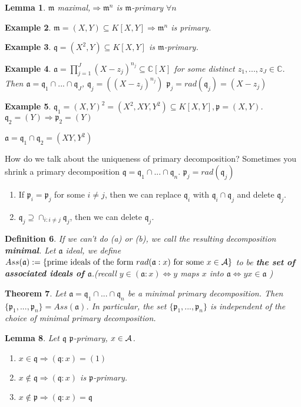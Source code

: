 \documentclass[11pt]{article}
\newtheorem{thm}{Theorem}[section]
\newtheorem{lemma}[thm]{Lemma}
\newtheorem{dfn}[thm]{Definition}
\newtheorem{ex}[thm]{Example}
\newcommand{\cplx}{\mathbb C}
\newcommand{\sca}{{\mathfrak a}}
\newcommand{\scm}{{\mathfrak m}}
\newcommand{\scp}{{\mathfrak p}}
\newcommand{\scq}{\mathfrak q}
\newcommand{\cala}{{\cal A}}
\newcommand{\Lrta}{\Longrightarrow}
\newcommand{\Llrta}{\Longleftrightarrow}
\begin{document}
\begin{lemma}
$\scm$ maximal,$\Lrta\scm^n$ is $\scm$-primary $\forall n$
\end{lemma}
\begin{ex}
$\scm=(X,Y)\subseteq K[X,Y]\Lrta \scm^n$ is primary.
\end{ex}
\begin{ex}
$\scq=(X^2,Y)\subseteq K[X,Y]$ is $\scm$-primary.
\end{ex}
\begin{ex}
$\sca=\prod^J_{j=1}(X-z_j)^{n_j}\subseteq \cplx[X]$ for some distinct $z_1,...,z_J\in\cplx$. Then $\sca=\scq_1\cap...\cap\scq_J$, $\scq_j=((X-z_j)^{n_j})$ $\scp_j=rad(\scq_j)=(X-z_j)$ 
\end{ex}
\begin{ex}
$\scq_1=(X,Y)^2=(X^2,XY,Y^2)\subseteq K[X,Y],\scp=(X,Y)$. $\scq_2=(Y)\Lrta \scp_2=(Y)$

$\sca=\scq_1\cap\scq_2=(XY,Y^2)$
\end{ex}

How do we talk about the uniqueness of primary decomposition?
Sometimes you shrink a primary decomposition $\scq=\scq_1\cap...\cap\scq_n$. $\scp_j=rad(\scq_j)$ 
\begin{enumerate}[label=(\alph*)]
\item If $\scp_i=\scp_j$ for some $i\neq j$, then we can replace $\scq_i$ with $\scq_i\cap\scq_j$ and delete $\scq_j$.
\item $\scq_j\supseteq \cap_{i:i\neq j}\scq_j$, then we can delete $\scq_j$.
\end{enumerate}
\begin{dfn}
If we can't do (a) or (b), we call the resulting decomposition \textbf{minimal}. Let $\sca$ ideal, we define $Ass(\sca):=\{\text{prime ideals of the form $rad(\sca:x)$ for some $x\in\cala$}\}$ to be \textbf{the set of associated ideals of $\sca$}.(recall $y\in(\sca:x)\Llrta y$ maps $x$ into $\sca\Llrta yx\in\sca$ )
\end{dfn}

\begin{thm}\label{thm:primary_decomposition}
Let $\sca=\scq_1\cap...\cap\scq_n$ be a minimal primary decomposition. Then $\{\scp_1,...,\scp_n\}=Ass(\sca)$. In particular, the set $\{\scp_1,...,\scp_n\}$ is independent of the choice of minimal primary decomposition.
\end{thm}

\begin{lemma}\label{lem:p-primary_ideal}
Let $\scq$ $\scp$-primary, $x\in\cala$.\\
\begin{enumerate}[label=(\alph*)]
 \item
 $x\in\scq\Lrta(\scq:x)=(1)$
\item 
 $x\notin\scq\Lrta (\scq:x)$ is $\scp$-primary.
\item 
 $x\notin\scp\Lrta (\scq:x)=\scq$
\end{enumerate}
\end{lemma}
\end{document}

